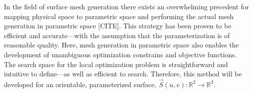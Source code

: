 In the field of surface mesh generation there exists an overwhelming
precedent for mapping physical space to parametric space and performing
the actual mesh generation in parametric space [CITE]. This strategy has
been proven to be efficient and accurate---with the assumption that the
parameterization is of reasonable quality. Here, mesh generation in
parametric space also enables the development of unambiguous
optimization constrains and objective functions. The search space for
the local optimization problem is straightforward and intuitive to
define---as well as efficient to search. Therefore, this method will be
developed for an orientable, parameterized surface,
$\vec{S}\left(u,v\right) : {\mathbb R}^2 \rightarrow {\mathbb R}^3$.
